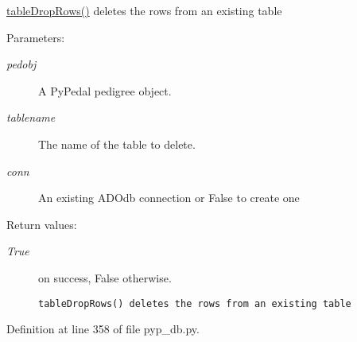 \hyperlink{namespacePyPedal_1_1pyp__db_b164d7c09eb9d86560432668b491a467}{table\-Drop\-Rows()} deletes the rows from an existing table 

\begin{Desc}
\item[Parameters:]
\begin{description}
\item[{\em pedobj}]A Py\-Pedal pedigree object. \item[{\em tablename}]The name of the table to delete. \item[{\em conn}]An existing ADOdb connection or False to create one \end{description}
\end{Desc}
\begin{Desc}
\item[Return values:]
\begin{description}
\item[{\em True}]on success, False otherwise.

\footnotesize\begin{verbatim}tableDropRows() deletes the rows from an existing table
\end{verbatim}
\normalsize
 \end{description}
\end{Desc}


Definition at line 358 of file pyp\_\-db.py.